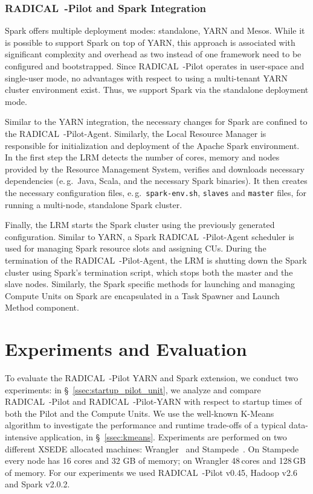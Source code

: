 \subsubsection*{RADICAL~-Pilot and Spark Integration}
\label{sssec:rp_spark}
Spark offers multiple deployment modes: standalone, YARN and Mesos.
While it is possible to support Spark on top of YARN, this approach is associated with significant complexity and overhead as two instead of one framework need to be configured and bootstrapped.
Since RADICAL~-Pilot operates in user-space and single-user mode, no advantages with respect to using a multi-tenant YARN cluster environment exist.
Thus, we support Spark via the standalone deployment mode.

Similar to the YARN integration, the necessary changes for Spark are confined to the RADICAL~-Pilot-Agent.
Similarly, the Local Resource Manager is responsible for initialization and deployment of the Apache Spark environment.
In the first step the LRM detects the number of cores, memory and nodes provided by the Resource Management System, verifies and downloads necessary dependencies (e.\,g.\ Java, Scala, and the necessary Spark binaries).
It then creates the necessary configuration files, e.\,g.\ \texttt{spark-env.sh}, \texttt{slaves} and \texttt{master} files, for running a multi-node, standalone Spark cluster.

Finally, the LRM starts the Spark cluster using the previously generated configuration.
Similar to YARN, a Spark RADICAL~-Pilot-Agent scheduler is used for managing Spark resource slots and assigning CUs.
During the termination of the RADICAL~-Pilot-Agent, the LRM is shutting down the Spark cluster using Spark’s termination script, which stops both the master and the slave nodes.
Similarly, the Spark specific methods for launching and managing Compute Units on Spark are encapsulated in a Task Spawner and Launch Method component.

\section{Experiments and Evaluation}
\label{sec:rph-exps}

To evaluate the RADICAL~-Pilot YARN and Spark extension, we conduct two experiments: in \S~\ref{ssec:startup_pilot_unit}, we analyze and compare RADICAL~-Pilot and RADICAL~-Pilot-YARN with respect to startup times of both the Pilot and the Compute Units.
We use the well-known K-Means algorithm to investigate the performance and runtime trade-offs of a typical data-intensive application, in \S~\ref{ssec:kmeans}.
Experiments are performed on two different XSEDE allocated machines: Wrangler~\cite{wrangler} and Stampede~\cite{stampede}.
On Stampede every node has 16 cores and 32 GB of memory; on Wrangler 48\,cores and 128\,GB of memory.
For our experiments we used RADICAL~-Pilot v0.45, Hadoop v2.6 and Spark v2.0.2.

